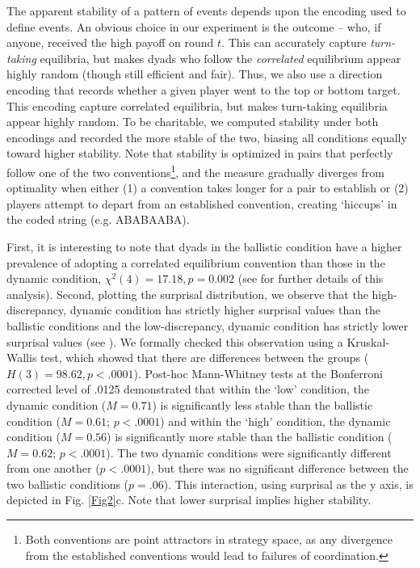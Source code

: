 \documentclass[10pt,letterpaper]{article}
\begin{document}
The apparent stability of a pattern of events depends upon the encoding used to define events. An obvious choice in our experiment is the outcome -- who, if anyone, received the high payoff on round $t$. This can accurately capture \emph{turn-taking} equilibria, but makes dyads who follow the \emph{correlated} equilibrium appear highly random (though still efficient and fair). Thus, we also use a direction encoding that records whether a given player went to the top or bottom target. This encoding capture correlated equilibria, but makes turn-taking equilibria appear highly random. To be charitable, we computed stability under both encodings and recorded the more stable of the two, biasing all conditions equally toward higher stability. Note that stability is optimized in pairs that perfectly follow one of the two conventions\footnote{Both conventions are point attractors in strategy space, as any divergence from the established conventions would lead to failures of coordination.}, and the measure gradually diverges from optimality when either (1) a convention takes longer for a pair to establish or (2) players attempt to depart from an established convention, creating `hiccups' in the coded string (e.g. ABABAABA).

First, it is interesting to note that dyads in the ballistic condition have a higher prevalence of adopting a correlated equilibrium convention than those in the dynamic condition, $\chi^2(4) = 17.18, p = 0.002$ (see  for further details of this analysis). Second, plotting the surprisal distribution, we observe that the high-discrepancy, dynamic condition has strictly higher surprisal values than the ballistic conditions and the low-discrepancy, dynamic condition has strictly lower surprisal values  (see ). We formally checked this observation using a Kruskal-Wallis test, which showed that there are differences between the groups ($H(3) = 98.62, p < .0001$). Post-hoc Mann-Whitney tests at the Bonferroni corrected level of .0125 demonstrated that within the `low' condition, the dynamic condition ($M = 0.71$) is significantly less stable than the ballistic condition ($M=0.61$; $p < .0001$) and within the `high' condition, the dynamic condition ($M=0.56$) is significantly more stable than the ballistic condition ($M=0.62$; $p < .0001$). The two dynamic conditions were significantly different from one another ($p < .0001$), but there was no significant difference between the two ballistic conditions ($p = .06$). This interaction, using surprisal as the y axis, is depicted in Fig. \ref{Fig2}c. Note that lower surprisal implies higher stability.
\end{document}
